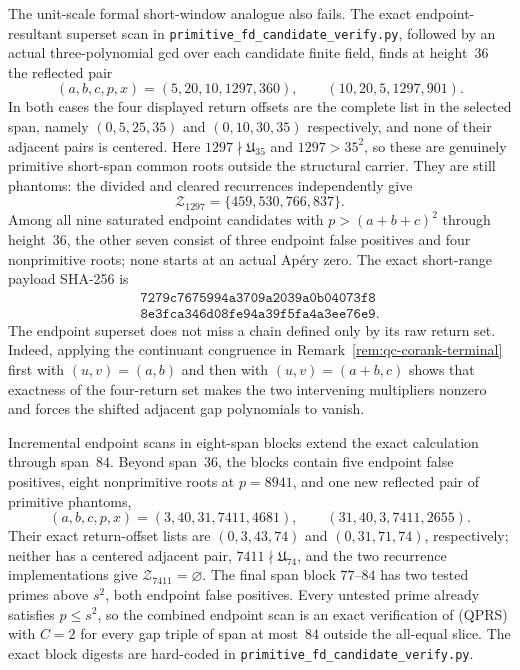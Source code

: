 \begin{remark}
The unit-scale formal short-window analogue also fails.  The exact endpoint-resultant
superset scan in \texttt{primitive\_fd\_candidate\_verify.py}, followed by
an actual three-polynomial gcd over each candidate finite field, finds at
height~$36$ the reflected pair
\[
 (a,b,c,p,x)=(5,20,10,1297,360),
 \qquad (10,20,5,1297,901).
\]
In both cases the four displayed return offsets are the complete list in
the selected span, namely $(0,5,25,35)$ and $(0,10,30,35)$ respectively,
and none of their adjacent pairs is centered.  Here
$1297\nmid\mathfrak U_{35}$ and $1297>35^2$, so these are genuinely
primitive short-span common roots outside the structural carrier.
They are still phantoms: the divided and cleared recurrences independently
give
\[
 \mathcal Z_{1297}=\{459,530,766,837\}.
\]
Among all nine saturated endpoint candidates with $p>(a+b+c)^2$ through
height~$36$, the other seven consist of three endpoint false positives and
four nonprimitive roots; none starts at an actual Ap\'ery zero.  The exact
short-range payload SHA-256 is
\[
 \begin{gathered}
  \texttt{7279c7675994a3709a2039a0b04073f8}\\
 \texttt{8e3fca346d08fe94a39f5fa4a3ee76e9}.
 \end{gathered}
\]
The endpoint superset does not miss a chain defined only by its raw return
set.  Indeed, applying the continuant congruence in
Remark~\ref{rem:qc-corank-terminal} first with $(u,v)=(a,b)$ and then with
$(u,v)=(a+b,c)$ shows that exactness of the four-return set makes the two
intervening multipliers nonzero and forces the shifted adjacent gap
polynomials to vanish.

Incremental endpoint scans in eight-span blocks extend the exact calculation
through span~$84$.  Beyond span~$36$, the blocks contain five endpoint false
positives, eight nonprimitive roots at $p=8941$, and one new reflected pair of
primitive phantoms,
\[
 (a,b,c,p,x)=(3,40,31,7411,4681),\qquad
 (31,40,3,7411,2655).
\]
Their exact return-offset lists are $(0,3,43,74)$ and $(0,31,71,74)$,
respectively; neither has a centered adjacent pair,
$7411\nmid\mathfrak U_{74}$, and the two recurrence implementations give
$\mathcal Z_{7411}=\varnothing$.  The final span block $77$--$84$ has two
tested primes above $s^2$, both endpoint false positives.  Every untested
prime already satisfies $p\le s^2$, so the combined endpoint scan is an exact
verification of \textup{(QPRS)} with $C=2$ for every gap triple of span at
most~$84$ outside the all-equal slice.  The exact block digests are hard-coded
in \texttt{primitive\_fd\_candidate\_verify.py}.


\end{remark}
